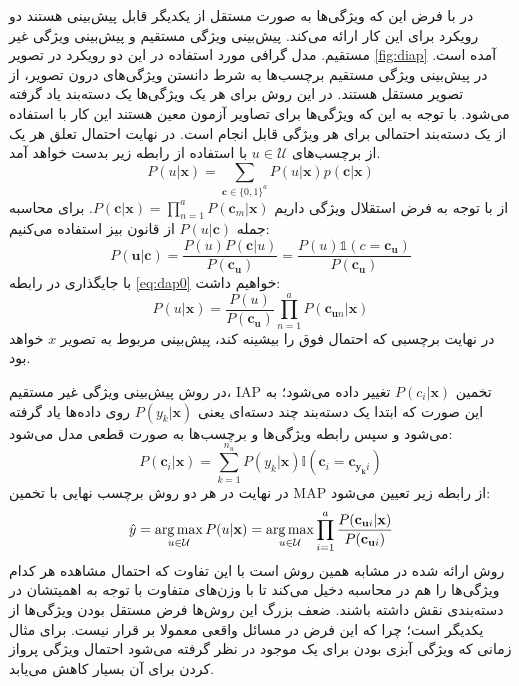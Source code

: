 در
\cite{lampert09}
با فرض این که ویژگی‌ها به صورت مستقل از یکدیگر قابل پیش‌بینی هستند دو رویکرد برای این کار ارائه می‌کند. پیش‌بینی ویژگی مستقیم
و پیش‌بینی ویژگی غیر مستقیم.
 مدل گرافی مورد استفاده در این دو رویکرد در تصویر \ref{fig:diap} آمده است. در پیش‌بینی ویژگی مستقیم برچسب‌ها به شرط دانستن ویژگی‌های درون تصویر، از تصویر مستقل هستند. در این روش برای هر یک ویژگی‌ها یک دسته‌بند یاد گرفته می‌شود. با توجه به این که ویژگی‌ها برای تصاویر آزمون معین هستند این کار با استفاده از یک دسته‌بند احتمالی برای هر ویژگی قابل انجام است. در نهایت احتمال تعلق هر یک از برچسب‌های
$ u \in \mathcal{U} $
با استفاده از رابطه زیر بدست خواهد آمد.
\begin{equation} \label{eq:dap0}
  P(u | \mathbf{x}  ) = \sum_{\mathbf{c} \in \{0,1\}^a} P(u | \mathbf{x} ) p(\mathbf{c} |\mathbf{x} )
\end{equation}
از با توجه به فرض استقلال ویژگی داریم
$P(\mathbf{c} |\mathbf{x} ) = \prod_{n=1}^a P(\mathbf{c} _m |\mathbf{x} )$.
برای محاسبه جمله 
$P(u | \mathbf{c} )$ 
از قانون بیز استفاده می‌کنیم:
\[
P(\mathbf{u}  | \mathbf{c} ) = \frac{P(u)P(\mathbf{c} |u)}{P(\mathbf{c_u} )}  = \frac {P(u) \mathds{1}(c= \mathbf{c_u} )} {P(\mathbf{c_u} )}
\]
با جایگذاری در رابطه \eqref{eq:dap0} خواهیم داشت:
\begin{equation}
  P(u | \mathbf{x}  ) = \frac{P(u)}{P(\mathbf{c_u} )} \prod_{n=1}^a P(\mathbf{c}_{\mathbf{u} n}|\mathbf{x} )
\end{equation}
در نهایت برچسبی که احتمال فوق را بیشینه کند، پیش‌بینی مربوط به تصویر $x$ خواهد بود.

در روش پیش‌بینی ویژگی غیر مستقیم، IAP
 تخمین  $P(c_i|\mathbf{x}) $ تغییر داده می‌شود؛ به این صورت که ابتدا یک دسته‌بند چند دسته‌ای یعنی $P(y_k |\mathbf{x})$ روی داده‌ها یاد گرفته می‌شود و سپس رابطه ویژگی‌ها و برچسب‌ها به صورت قطعی مدل می‌شود:
\begin{equation}
P(\mathbf{c}_i | \mathbf{x}) = \sum_{k=1}^{n_u} P(y_k | \mathbf{x}) \mathbb{I}(\mathbf{c}_i = \mathbf{c}_{\mathbf{y_k}i})
\end{equation}
در نهایت در هر دو روش برچسب نهایی با تخمین MAP
از رابطه زیر تعیین می‌شود:
\begin{equation}
\hat{y} = \operatorname*{arg\,max}_{u \in \mathcal{U}} P(u|\mathbf{x}) =  \operatorname*{arg\,max}_{u \in \mathcal{U}} \prod_{i=1}^a \frac{P(\mathbf{c}_{\mathbf{u}i} | \mathbf{x})}{P(\mathbf{c}_{\mathbf{u}i})}
\end{equation}
روش ارائه شده در
\cite{suzuki14}
مشابه همین روش است با این تفاوت که احتمال مشاهده هر کدام ویژگی‌ها را هم در محاسبه دخیل می‌کند تا با وزن‌های متفاوت با توجه به اهمیتشان در دسته‌بندی نقش داشته باشند. ضعف بزرگ این روش‌ها فرض مستقل بودن ویژگی‌ها از یکدیگر است؛ چرا که این فرض در مسائل واقعی معمولا بر قرار نیست. برای مثال زمانی که ویژگی آبزی بودن برای یک موجود در نظر گرفته می‌شود احتمال ویژگی پرواز کردن برای آن بسیار کاهش می‌یابد.
